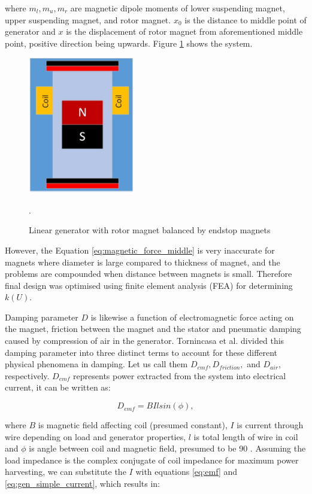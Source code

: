 where $m_l, m_u, m_r$ are magnetic dipole moments of lower suspending magnet, upper suspending magnet, and rotor magnet. $x_0$ is the distance to middle point of generator and $x$ is the displacement of rotor magnet from aforementioned middle point, positive direction being upwards. Figure \ref{fig:lg} shows the system.

\begin{figure}[htb]
\begin{center}
\includegraphics[height=6cm]{images/own_dwg/generator}
\end{center}
\caption{Linear generator with rotor magnet balanced by endstop magnets}.
\label{fig:lg}
\end{figure}

However, the Equation \eqref{eq:magnetic_force_middle} is very inaccurate for magnets where diameter is large compared to thickness of magnet, and the problems are compounded when distance between magnets is small. Therefore final design was optimised using finite element analysis (FEA) for determining $k(U)$. 

Damping parameter $D$ is likewise a function of electromagnetic force acting on the magnet, friction between the magnet and the stator and pneumatic damping caused by compression of air in the generator. Tornincasa et al. \cite{Tornincasa2012} divided this damping parameter into three distinct terms to account for these different physical phenomena in damping. Let us call them $D_{emf}, D_{friction},$ and $D_{air}$, respectively. $D_{emf}$ represents power extracted from the system into electrical current, it can be written as:

\begin{equation}\label{eq:d_emd}
  D_{emf} = BIlsin(\phi),
\end{equation}

where $B$ is magnetic field affecting coil (presumed constant), $I$ is current through wire depending on load and generator properties, $l$ is total length of wire in coil and $\phi$ is angle between coil and magnetic field, presumed to be 90 \degree. Assuming the load impedance is the complex conjugate of coil impedance for maximum power harvesting, we can substitute the $I$ with equations \eqref{eq:emf} and \eqref{eq:gen_simple_current}, which results in: 

